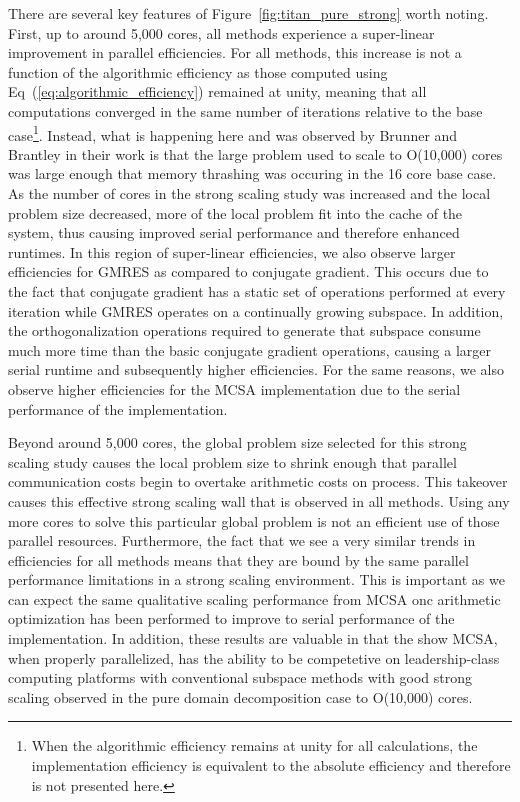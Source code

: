 There are several key features of Figure~\ref{fig:titan_pure_strong}
worth noting. First, up to around 5,000 cores, all methods experience
a super-linear improvement in parallel efficiencies. For all methods,
this increase is not a function of the algorithmic efficiency as those
computed using Eq~(\ref{eq:algorithmic_efficiency}) remained at unity,
meaning that all computations converged in the same number of
iterations relative to the base case\footnote{When the algorithmic
  efficiency remains at unity for all calculations, the implementation
  efficiency is equivalent to the absolute efficiency and therefore is
  not presented here.}. Instead, what is happening here and was
observed by Brunner and Brantley in their work is that the large
problem used to scale to O(10,000) cores was large enough that memory
thrashing was occuring in the 16 core base case. As the number of
cores in the strong scaling study was increased and the local problem
size decreased, more of the local problem fit into the cache of the
system, thus causing improved serial performance and therefore
enhanced runtimes. In this region of super-linear efficiencies, we
also observe larger efficiencies for GMRES as compared to conjugate
gradient. This occurs due to the fact that conjugate gradient has a
static set of operations performed at every iteration while GMRES
operates on a continually growing subspace. In addition, the
orthogonalization operations required to generate that subspace
consume much more time than the basic conjugate gradient operations,
causing a larger serial runtime and subsequently higher
efficiencies. For the same reasons, we also observe higher
efficiencies for the MCSA implementation due to the serial performance
of the implementation.

Beyond around 5,000 cores, the global problem size selected for this
strong scaling study causes the local problem size to shrink enough
that parallel communication costs begin to overtake arithmetic costs
on process. This takeover causes this effective strong scaling wall
that is observed in all methods. Using any more cores to solve this
particular global problem is not an efficient use of those parallel
resources. Furthermore, the fact that we see a very similar trends in
efficiencies for all methods means that they are bound by the same
parallel performance limitations in a strong scaling environment. This
is important as we can expect the same qualitative scaling performance
from MCSA onc arithmetic optimization has been performed to improve to
serial performance of the implementation. In addition, these results
are valuable in that the show MCSA, when properly parallelized, has
the ability to be competetive on leadership-class computing platforms
with conventional subspace methods with good strong scaling observed
in the pure domain decomposition case to O(10,000) cores.


